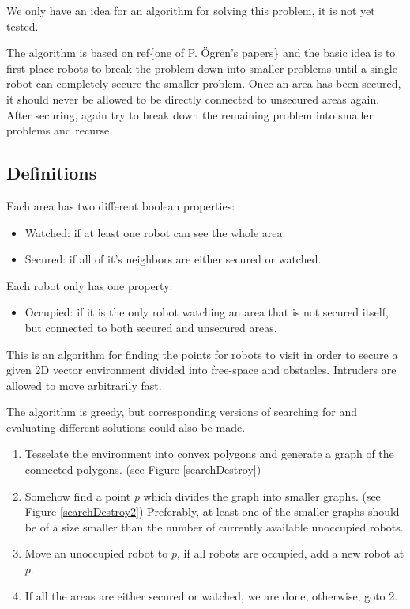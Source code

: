 We only have an idea for an algorithm for solving this problem, it is not yet tested.

The algorithm is based on ref\{one of P. Ögren's papers\} and the basic idea is to first place robots to break the problem down into smaller problems until a single robot can completely secure the smaller problem.
Once an area has been secured, it should never be allowed to be directly connected to unsecured areas again.
After securing, again try to break down the remaining problem into smaller problems and recurse.

\subsection{Definitions}
Each area has two different boolean properties:
\begin{itemize}
	\item Watched: if at least one robot can see the whole area.
	\item Secured: if all of it's neighbors are either secured or watched.
\end{itemize}

Each robot only has one property:
\begin{itemize}
	\item Occupied: if it is the only robot watching an area that is not secured itself, but connected to both secured and unsecured areas.
\end{itemize}

\begin{algorithm}
This is an algorithm for finding the points for robots to visit in order to secure a given 2D vector environment divided into free-space and obstacles. Intruders are allowed to move arbitrarily fast.

The algorithm is greedy, but corresponding versions of searching for and evaluating different solutions could also be made.
\begin{enumerate}
	\item Tesselate the environment into convex polygons and generate a graph of the connected polygons. (see Figure \ref{searchDestroy})
	\item Somehow find a point $p$ which divides the graph into smaller graphs. (see Figure \ref{searchDestroy2})
			Preferably, at least one of the smaller graphs should be of a size smaller than the number of currently available unoccupied robots.
	\item Move an unoccupied robot to $p$, if all robots are occupied, add a new robot at $p$.
	\item If all the areas are either secured or watched, we are done, otherwise, goto 2.
\end{enumerate}
\label{algSearchDestroyIdea}
\end{algorithm}

